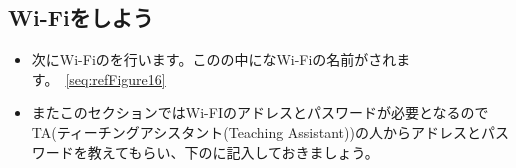 \documentclass[a4paper,12pt]{jarticle}
\begin{document}
\begin{enumerate}
    \subsection{\theExercise Wi-Fiをしよう}
                \begin{itemize}
                  \item
                        次にWi-Fiのを行います。このの中になWi-Fiの名前がされます。~\ref{seq:refFigure16}
                        \item   
                        \theQuestion またこのセクションではWi-FIのアドレスとパスワードが必要となるのでTA(ティーチングアシスタント(Teaching Assistant))の人からアドレスとパスワードを教えてもらい、下のに記入しておきましょう。    
                        \begin{table}[htbp]
                          \centering
                          

\end{table}
\end{itemize}
\end{enumerate}
\end{document}

